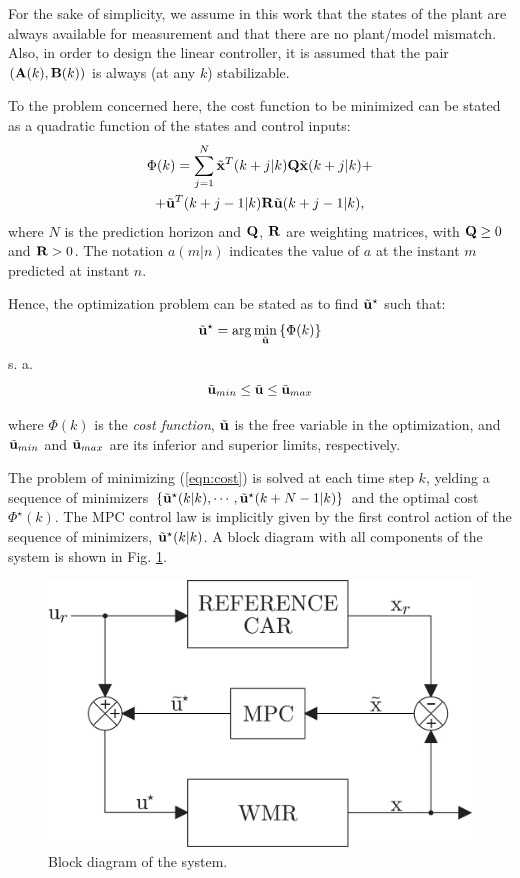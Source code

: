 \documentclass[conference]{IEEEtran} %
\begin{document}
For the sake of simplicity, we assume in this work that the states of the plant are always available for measurement and that there are no plant/model mismatch. Also, in order to design the linear controller, it is assumed that the pair $({\bf A}(k),{\bf B}(k))$ is always (at any $k$) stabilizable.

To the problem concerned here, the cost function to be minimized can be stated as a quadratic function of the states and control inputs:
\begin{multline}\label{eqn:cost}
	\Phi(k) = \sum_{j=1}^{N}\tilde{\bf x}^T(k+j|k){\bf Q}\tilde{\bf x}(k+j|k) + \\ + \tilde{\bf u}^T(k+j-1|k){\bf R}\tilde{\bf u}(k+j-1|k),
\end{multline}
\noindent where $N$ is the prediction horizon and ${\bf Q}$, ${\bf R}$ are weighting matrices, with ${\bf Q}\geq 0$ and ${\bf R}>0$. The notation $a(m|n)$ indicates the value of $a$ at the instant $m$ predicted at instant $n$.

Hence, the optimization problem can be stated as to find $\tilde{\bf u}^\star$ such that:
\begin{equation*}
	\tilde{\bf u}^\star = \arg\min_{\tilde{\bf u}}\left\{\Phi(k)\right\}
\end{equation*}
\noindent s. a.
\begin{equation*}
	\tilde{\bf u}_{min} \leq \tilde{\bf u} \leq \tilde{\bf u}_{max}
\end{equation*}

\noindent where $\Phi(k)$ is the {\em cost function}, $\tilde{\bf u}$ is the
free variable in the optimization, and $\tilde{\bf u}_{min}$ and
$\tilde{\bf u}_{max}$ are its inferior and superior limits, respectively.

The problem of minimizing (\ref{eqn:cost}) is solved at each time step $k$, yelding a sequence of minimizers $\{\tilde{\bf u}^\star(k|k),\cdots,\tilde{\bf u}^\star(k+N-1|k)\}$ and the optimal cost $\Phi^\star(k)$. The MPC control law is implicitly given by the first control action of the sequence of minimizers, $\tilde{\bf u}^\star(k|k)$. A block diagram with all components of the system is shown in Fig. \ref{fig:bloco}.

\begin{figure}[htbp]
	\centering
	\includegraphics[width=.84\linewidth]{Figures/bloco.eps}
	\caption{Block diagram of the system.}
	\label{fig:bloco}
\end{figure}
\end{document}
